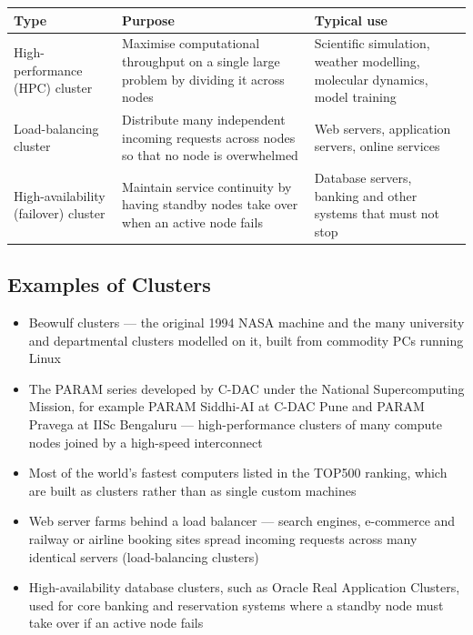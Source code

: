 \documentclass[../main.tex]{subfiles}
\begin{document}
\begin{center}
\begin{tabularx}{\textwidth}{@{}p{3.6cm}LL@{}}
\toprule
\textbf{Type} & \textbf{Purpose} & \textbf{Typical use} \\
\midrule
High-performance (HPC) cluster & Maximise computational throughput on a
  single large problem by dividing it across nodes & Scientific simulation,
  weather modelling, molecular dynamics, model training \\
Load-balancing cluster & Distribute many independent incoming requests
  across nodes so that no node is overwhelmed & Web servers, application
  servers, online services \\
High-availability (failover) cluster & Maintain service continuity by having
  standby nodes take over when an active node fails & Database servers,
  banking and other systems that must not stop \\
\bottomrule
\end{tabularx}
\end{center}

\subsection{Examples of Clusters}

\begin{itemize}
  \item Beowulf clusters --- the original 1994 NASA machine and the many
        university and departmental clusters modelled on it, built from
        commodity PCs running Linux
  \item The PARAM series developed by C-DAC under the National
        Supercomputing Mission, for example PARAM Siddhi-AI at C-DAC Pune and
        PARAM Pravega at IISc Bengaluru --- high-performance clusters of many
        compute nodes joined by a high-speed interconnect~
  \item Most of the world's fastest computers listed in the TOP500 ranking,
        which are built as clusters rather than as single custom
        machines~
  \item Web server farms behind a load balancer --- search engines,
        e-commerce and railway or airline booking sites spread incoming
        requests across many identical servers (load-balancing clusters)
  \item High-availability database clusters, such as Oracle Real Application
        Clusters, used for core banking and reservation systems where a
        standby node must take over if an active node fails
\end{itemize}
\end{document}
